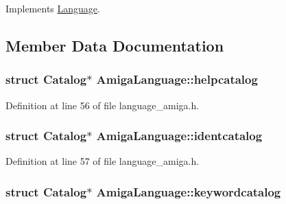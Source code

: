 Implements \hyperlink{classLanguage_a232a8b51c7866013363b9916fe89299c}{Language}.



\subsection{Member Data Documentation}
\subsubsection[{\texorpdfstring{helpcatalog}{helpcatalog}}]{\setlength{\rightskip}{0pt plus 5cm}struct Catalog$\ast$ Amiga\+Language\+::helpcatalog\hspace{0.3cm}{\ttfamily [private]}}\hypertarget{classAmigaLanguage_ac0669a78cab7ed334b4b1a0fea654f99}{}\label{classAmigaLanguage_ac0669a78cab7ed334b4b1a0fea654f99}


Definition at line 56 of file language\+\_\+amiga.\+h.

\subsubsection[{\texorpdfstring{identcatalog}{identcatalog}}]{\setlength{\rightskip}{0pt plus 5cm}struct Catalog$\ast$ Amiga\+Language\+::identcatalog\hspace{0.3cm}{\ttfamily [private]}}\hypertarget{classAmigaLanguage_ae1cecac3020a1d4b4215140614b542e8}{}\label{classAmigaLanguage_ae1cecac3020a1d4b4215140614b542e8}


Definition at line 57 of file language\+\_\+amiga.\+h.

\subsubsection[{\texorpdfstring{keywordcatalog}{keywordcatalog}}]{\setlength{\rightskip}{0pt plus 5cm}struct Catalog$\ast$ Amiga\+Language\+::keywordcatalog\hspace{0.3cm}{\ttfamily [private]}}\hypertarget{classAmigaLanguage_a3ad331ae5de3cbd202c7effdee4fcfc8}{}\label{classAmigaLanguage_a3ad331ae5de3cbd202c7effdee4fcfc8}


